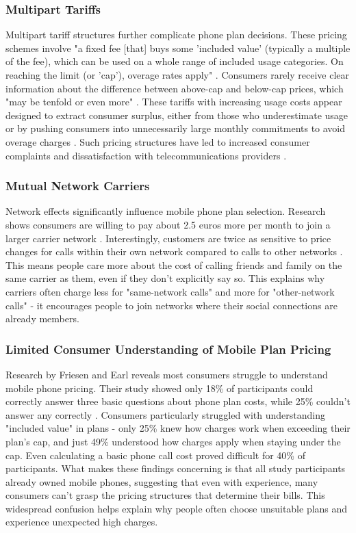 \documentclass[conference]{IEEEtran}
\begin{document}
\subsubsection{Multipart Tariffs}
Multipart tariff structures further complicate phone plan decisions. These pricing schemes involve "a fixed fee [that] buys some 'included value' (typically a multiple of the fee), which can be used on a whole range of included usage categories. On reaching the limit (or 'cap'), overage rates apply" \cite{b1}. Consumers rarely receive clear information about the difference between above-cap and below-cap prices, which "may be tenfold or even more" \cite{b1}. These tariffs with increasing usage costs appear designed to extract consumer surplus, either from those who underestimate usage or by pushing consumers into unnecessarily large monthly commitments to avoid overage charges \cite{b1}. Such pricing structures have led to increased consumer complaints and dissatisfaction with telecommunications providers \cite{b1}.
\subsubsection{Mutual Network Carriers}
Network effects significantly influence mobile phone plan selection. Research shows consumers are willing to pay about 2.5 euros more per month to join a larger carrier network \cite{b2}. Interestingly, customers are twice as sensitive to price changes for calls within their own network compared to calls to other networks \cite{b2}. This means people care more about the cost of calling friends and family on the same carrier as them, even if they don't explicitly say so. This explains why carriers often charge less for "same-network calls" and more for "other-network calls" - it encourages people to join networks where their social connections are already members.
\subsubsection{Limited Consumer Understanding of Mobile Plan Pricing}
Research by Friesen and Earl reveals most consumers struggle to understand mobile phone pricing. Their study showed only 18\% of participants could correctly answer three basic questions about phone plan costs, while 25\% couldn't answer any correctly \cite{b1}. Consumers particularly struggled with understanding "included value" in plans - only 25\% knew how charges work when exceeding their plan's cap, and just 49\% understood how charges apply when staying under the cap. Even calculating a basic phone call cost proved difficult for 40\% of participants. What makes these findings concerning is that all study participants already owned mobile phones, suggesting that even with experience, many consumers can't grasp the pricing structures that determine their bills. This widespread confusion helps explain why people often choose unsuitable plans and experience unexpected high charges.
\end{document}

